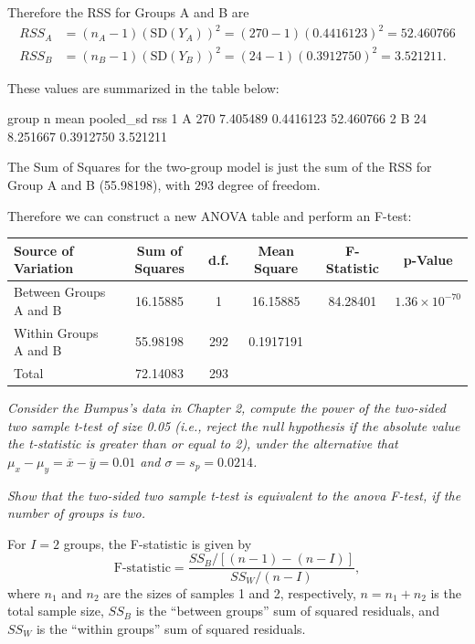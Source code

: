 \documentclass[11pt]{exam} %
\newenvironment{codeSmall}%
   {\par\noindent\adjustbox{margin=1ex,bgcolor=shadecolor,margin=0ex \medskipamount}\bgroup\minipage\linewidth\verbatim\footnotesize}%
   {\endverbatim\endminipage\egroup}
\begin{document}
\begin{questions}
\begin{parts}
Therefore the RSS for Groups A and B are
\begin{align*}
RSS_A &= (n_A - 1)\left( \text{SD}(Y_A)  \right)^2 = (270-1)(0.4416123)^2 = 52.460766\\
RSS_B &= (n_B - 1)\left( \text{SD}(Y_B)  \right)^2 = (24-1)(0.3912750)^2 = 3.521211.
\end{align*}


These values are summarized in the table below:
\begin{codeSmall}
  group   n     mean pooled_sd       rss
1     A 270 7.405489 0.4416123 52.460766
2     B  24 8.251667 0.3912750  3.521211
\end{codeSmall}

The Sum of Squares for the two-group model is just the sum of the RSS for Group A and B (55.98198), with $293$ degree of freedom.

Therefore we can construct a new ANOVA table and perform an F-test: 

\begin{center}
  \begin{tabular}{ l c c c c c}
    Source of Variation & Sum of Squares & d.f. & Mean Square & F-Statistic & p-Value \\ \hline \hline
    Between Groups A and B & 16.15885 & 1 & 16.15885 & 84.28401 & $1.36 \times 10^{-70}$ \\
    Within Groups A and B & 55.98198 & 292 & 0.1917191 & & \\ \hline
    Total & 72.14083 & 293 & & &
  \end{tabular}
\end{center}

\end{parts}







\titledquestion{} %
\textit{Consider the Bumpus's data in Chapter 2, compute the power of the two-sided two sample t-test of size 0.05 (i.e., reject the null hypothesis if the absolute value the t-statistic is greater than or equal to 2), under the alternative that $\mu_x - \mu_y = \overline{x} - \overline{y} = 0.01$ and $\sigma = s_p = 0.0214$.}


\titledquestion{} %
\textit{Show that the two-sided two sample t-test is equivalent to the anova F-test, if the number of groups is two.}


For $I=2$ groups, the F-statistic is given by
$$ \text{F-statistic} =  \frac{SS_B / \left[ (n-1) - (n-I) \right]}{SS_W / (n-I)}, $$
where $n_1$ and $n_2$ are the sizes of samples 1 and 2, respectively, $n=n_1+n_2$ is the total sample size, $SS_B$ is the ``between groups'' sum of squared residuals, and $SS_W$ is the ``within groups'' sum of squared residuals.


\end{questions}
\end{document}
